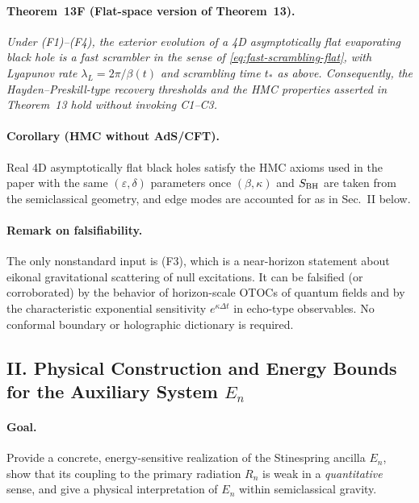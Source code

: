 \paragraph{Theorem~13F (Flat-space version of Theorem~13).}
\emph{Under (F1)--(F4), the exterior evolution of a 4D asymptotically flat evaporating black hole is a fast scrambler in the sense of \eqref{eq:fast-scrambling-flat}, with Lyapunov rate $\lambda_L=2\pi/\beta(t)$ and scrambling time $t_*$ as above. Consequently, the Hayden--Preskill-type recovery thresholds and the HMC properties asserted in Theorem~13 hold without invoking C1--C3.}

\paragraph{Corollary (HMC without AdS/CFT).}
Real 4D asymptotically flat black holes satisfy the HMC axioms used in the paper with the same $(\varepsilon,\delta)$ parameters once $(\beta,\kappa)$ and $S_{\rm BH}$ are taken from the semiclassical geometry, and edge modes are accounted for as in Sec.~II below.

\paragraph{Remark on falsifiability.}
The only nonstandard input is (F3), which is a near-horizon statement about eikonal gravitational scattering of null excitations. It can be falsified (or corroborated) by the behavior of horizon-scale OTOCs of quantum fields and by the characteristic exponential sensitivity $e^{\kappa \Delta t}$ in echo-type observables. No conformal boundary or holographic dictionary is required.

\bigskip
\subsection*{II. Physical Construction and Energy Bounds for the Auxiliary System \texorpdfstring{$E_n$}{E\_n}}
\paragraph{Goal.}
Provide a concrete, energy-sensitive realization of the Stinespring ancilla $E_n$, show that its coupling to the primary radiation $R_n$ is weak in a \emph{quantitative} sense, and give a physical interpretation of $E_n$ within semiclassical gravity.

